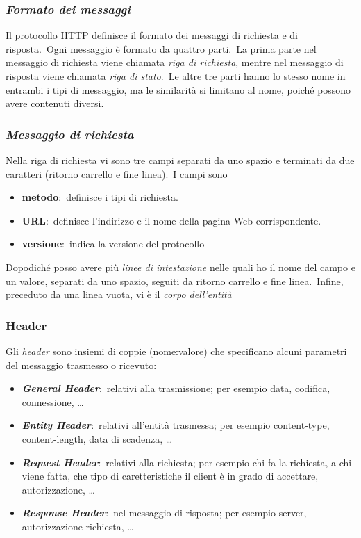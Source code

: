 \subsubsection{\emph{Formato dei messaggi}}

Il protocollo HTTP definisce il formato dei messaggi di richiesta e di risposta.\
Ogni messaggio è formato da quattro parti.\
La prima parte nel messaggio di richiesta viene chiamata \emph{riga di richiesta}, mentre nel messaggio di risposta viene chiamata \emph{riga di stato}.\
Le altre tre parti hanno lo stesso nome in entrambi i tipi di messaggio, ma le similarità si limitano al nome, poiché possono avere contenuti diversi.

\subsubsection{\emph{Messaggio di richiesta}}

Nella riga di richiesta vi sono tre campi separati da uno spazio e terminati da due caratteri (ritorno carrello e fine linea).\
I campi sono
\begin{itemize}
    \item \textbf{metodo}:\ definisce i tipi di richiesta.
    \item \textbf{URL}:\ definisce l'indirizzo e il nome della pagina Web corrispondente.
    \item \textbf{versione}:\ indica la versione del protocollo
\end{itemize}
Dopodiché posso avere più \emph{linee di intestazione} nelle quali ho il nome del campo e un valore, separati da uno spazio, seguiti da ritorno carrello e fine linea.\
Infine, preceduto da una linea vuota, vi è il \emph{corpo dell'entità}

\subsubsection{Header}

Gli \emph{header} sono insiemi di coppie (nome:valore) che specificano alcuni parametri del messaggio trasmesso o ricevuto:
\begin{itemize}
    \item \textbf{\emph{General Header}}:\ relativi alla trasmissione; per esempio data, codifica, connessione, \dots
    \item \textbf{\emph{Entity Header}}:\ relativi all'entità trasmessa; per esempio content-type, content-length, data di scadenza, \dots
    \item \textbf{\emph{Request Header}}:\ relativi alla richiesta; per esempio chi fa la richiesta, a chi viene fatta, che tipo di caretteristiche il client è in grado di accettare, autorizzazione, \dots
    \item \textbf{\emph{Response Header}}:\ nel messaggio di risposta; per esempio server, autorizzazione richiesta, \dots
\end{itemize}

